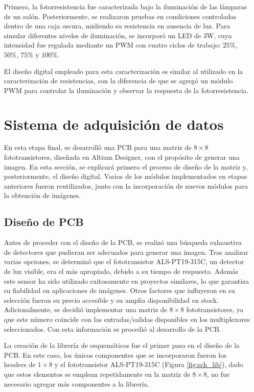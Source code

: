 Primero, la fotorresistencia fue caracterizada bajo la iluminación de las lámparas de un salón. Posteriormente, se realizaron pruebas en condiciones controladas dentro de una caja oscura, midiendo su resistencia en ausencia de luz. Para simular diferentes niveles de iluminación, se incorporó un LED de 3W, cuya intensidad fue regulada mediante un PWM con cuatro ciclos de trabajo: $25\%$, $50\%$, $75\%$ y $100\%$.

El diseño digital empleado para esta caracterización es similar al utilizado en la caracterización de resistencias, con la diferencia de que se agregó un módulo PWM para controlar la iluminación y observar la respuesta de la fotorresistencia. 



\section{Sistema de adquisición de datos}
En esta etapa final, se desarrolló una PCB para una matriz de $8\times 8$ fototransistores, diseñada en Altium Designer, con el propósito de generar una imagen. En esta sección, se explicará primero el proceso de diseño de la matriz y, posteriormente, el diseño digital. Varios de los módulos implementados en etapas anteriores fueron reutilizados, junto con la incorporación de nuevos módulos para la obtención de imágenes.

\subsection{Diseño de PCB}
Antes de proceder con el diseño de la PCB, se realizó una búsqueda exhaustiva de detectores que pudieran ser adecuados para generar una imagen. Tras analizar varias opciones, se determinó que el fototransistor ALS-PT19-315C, un detector de luz visible, era el más apropiado, debido a su tiempo de respuesta. Además este sensor ha sido utilizado exitosamente en proyectos similares, lo que garantiza su fiabilidad en aplicaciones de imágenes. Otros factores que influyeron en su selección fueron su precio accesible y su amplia disponibilidad en stock. Adicionalmente, se decidió implementar una matriz de $8\times 8$ fototransistores, ya que este número coincide con las entradas/salidas disponibles en los multiplexores seleccionados. Con esta información se procedió al desarrollo de la PCB. 


La creación de la librería de esquemáticos fue el primer paso en el diseño de la PCB. En este caso, los únicos componentes que se incorporaron fueron los headers de $1\times 8$ y el fototransistor ALS-PT19-315C (Figura \ref{fig:sch_lib}), dado que estos elementos se emplean repetidamente en la matriz de $8\times 8$, no fue necesario agregar más componentes a la librería.


